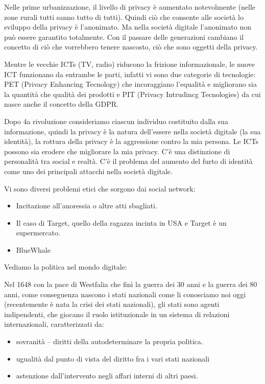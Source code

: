\documentclass[]{article}
\begin{document}
Nelle prime urbanizzazione, il livello di privacy è aumentato
notevolmente (nelle zone rurali tutti sanno tutto di tutti). Quindi ciò
che consente alle società lo sviluppo della privacy è l'anonimato. Ma
nella società digitale l'anonimato non può essere garantito totalmente.
Con il passare delle generazioni cambiano il concetto di ciò che
vorrebbero tenere nascosto, ciò che sono oggetti della privacy.

Mentre le vecchie ICTs (TV, radio) riducono la frizione informazionale,
le nuove ICT funzionano da entrambe le parti, infatti vi sono due
categorie di tecnologie: PET (Privacy Enhancing Tecnology) che
incoraggiano l'equalità e migliorano sia la quantità che qualità dei
prodotti e PIT (Privacy Intrudincg Tecnologies) da cui nasce anche il
concetto della GDPR.

Dopo 4a rivoluzione consideriamo ciascun individuo costituito dalla sua
informazione, quindi la privacy è la natura dell'essere nella società
digitale (la sua identità), la rottura della privacy è la aggressione
contro la mia persona. Le ICTs possono sia erodere che migliorare la mia
privacy. C'è una distinzione di personalità tra social e realtà. C'è il
problema del aumento del furto di identità come uno dei principali
attacchi nella società digitale.

Vi sono diversi problemi etici che sorgono dai social network:

\begin{itemize}
	 
	\item
	Incitazione all'anoressia o altre atti sbagliati.
	\item
	Il caso di Target, quello della ragazza incinta in USA e Target è un
	supermercato.
	\item
	BlueWhale
\end{itemize}

Vediamo la politica nel mondo digitale:

Nel 1648 con la pace di Westfalia che finì la guerra dei 30 anni e la
guerra dei 80 anni, come conseguenza nascono i stati nazionali come li
conosciamo noi oggi (recentemente è nata la crisi dei stati nazionali),
gli stati sono agenti indipendenti, che giocano il ruolo istituzionale
in un sistema di relazioni internazionali, caratterizzati da:

\begin{itemize}
	 
	\item
	sovranità -- diritti della autodeterminare la propria politica.
	\item
	ugualità dal punto di vista del diritto fra i vari stati nazionali
	\item
	astenzione dall'intervento negli affari interni di altri paesi.
\end{itemize}
\end{document}
